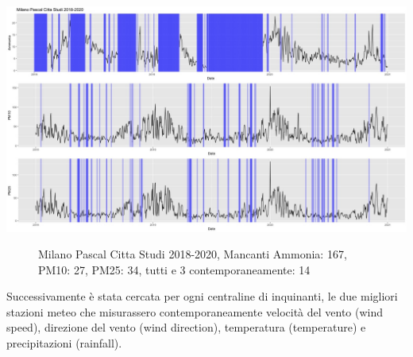 \documentclass{article}
\begin{document}
\includegraphics[scale=0.25]{Milano Pascal Citta Studi 2018-2020 .jpeg}
\begin{figure}[!h]
    \caption{Milano Pascal Citta Studi 2018-2020, Mancanti Ammonia: 167, PM10: 27, PM25: 34, tutti e 3 contemporaneamente: 14}
\end{figure}

Successivamente è stata cercata per ogni centraline di inquinanti, le due migliori 
stazioni meteo che misurassero contemporaneamente velocità del vento (wind speed), direzione del vento (wind direction), 
temperatura (temperature) e precipitazioni (rainfall).
\end{document}
